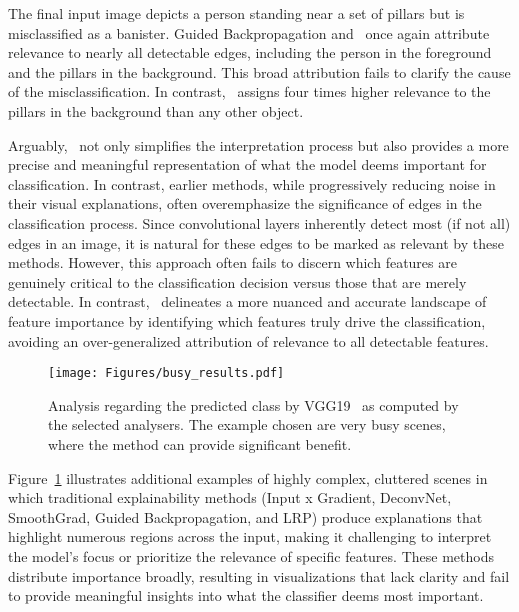 The final input image depicts a person standing near a set of pillars but is misclassified as a banister. Guided Backpropagation and \LRP\ once again attribute relevance to nearly all detectable edges, including the person in the foreground and the pillars in the background. This broad attribution fails to clarify the cause of the misclassification. In contrast, \CTC\ assigns four times higher relevance to the pillars in the background than any other object.

Arguably, \CTC\ not only simplifies the interpretation process but also provides a more precise and meaningful representation of what the model deems important for classification. In contrast, earlier methods, while progressively reducing noise in their visual explanations, often overemphasize the significance of edges in the classification process. Since convolutional layers inherently detect most (if not all) edges in an image, it is natural for these edges to be marked as relevant by these methods. However, this approach often fails to discern which features are genuinely critical to the classification decision versus those that are merely detectable. In contrast, \CTC\ delineates a more nuanced and accurate landscape of feature importance by identifying which features truly drive the classification, avoiding an over-generalized attribution of relevance to all detectable features.

\begin{figure}[ht!]
	\begin{center}
		\texttt{[image: Figures/busy\_results.pdf]}
	\end{center}
	\caption{Analysis regarding the predicted class by VGG19~\cite{SimonyanZ14a} as computed by the selected analysers. The example chosen are very busy scenes, where the method can provide significant benefit.}
	\label{Fig:busy}
\end{figure} 

Figure~\ref{Fig:busy} illustrates additional examples of highly complex, cluttered scenes in which traditional explainability methods (Input x Gradient, DeconvNet, SmoothGrad, Guided Backpropagation, and LRP) produce explanations that highlight numerous regions across the input, making it challenging to interpret the model's focus or prioritize the relevance of specific features. These methods distribute importance broadly, resulting in visualizations that lack clarity and fail to provide meaningful insights into what the classifier deems most important.

